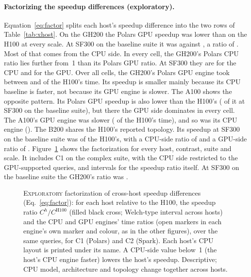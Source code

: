 \documentclass[11pt]{article}
\begin{document}
\paragraph{Factorizing the speedup differences (exploratory).}
Equation~\eqref{eq:factor} splits each host's speedup difference into the two
rows of Table~\ref{tab:xhost}. On the GH200 the Polars GPU speedup was lower
than on the H100 at every scale. At SF300 on the
baseline suite it was  against
, a ratio of
. Most of that comes from the CPU
side. In every cell, the GH200's Polars CPU ratio lies further from~1
than its Polars GPU ratio. At SF300 they are
 for the CPU and
 for the GPU. Over all cells, the GH200's Polars GPU engine took between
 and
 of the H100's time. Its speedup is
smaller mainly because its CPU baseline is faster, not because its GPU engine
is slower. The A100 shows the
opposite pattern. Its Polars GPU speedup is also lower than the H100's
( of it at SF300 on the baseline
suite), but there the GPU side dominates in every cell. The A100's GPU engine was slower
( of the H100's time), and so
was its CPU engine (). The
B200 shares the H100's reported topology. Its speedup at SF300 on the baseline
suite was  of the H100's, with a
CPU-side ratio of  and a GPU-side
ratio of .
\ifdecomp
Figure~\ref{fig:decomp} shows the factorization for every host, contrast,
suite and scale. It includes C1 on the complex suite, with the CPU side
restricted to the GPU-supported queries, and intervals for the speedup ratio
itself. At SF300 on the baseline suite the GH200's ratio was
.

\begin{figure}[t]
\centering
{}
\caption{\textsc{Exploratory} factorization of cross-host speedup differences
(Eq.~\eqref{eq:factor}): for each host relative to the H100, the speedup ratio
$C^{h}/C^{\text{H100}}$ (filled black cross; Welch-type interval across hosts)
and the CPU and GPU engines' time ratios (open markers in each engine's own
marker and colour, as in the other figures), over the same queries, for C1
(Polars) and C2 (Spark). Each host's CPU layout is printed under its name. A CPU-side value below~1 (the
host's CPU engine faster) lowers the host's speedup. Descriptive; CPU model,
architecture and topology change together across hosts. \chartnote}
\label{fig:decomp}
\end{figure}
\fi
\end{document}
